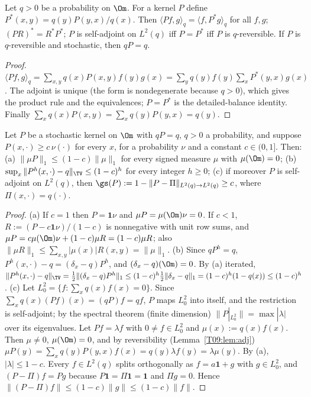 \documentclass[11pt]{report}
\begin{document}
\begin{T09lemma}[Adjoints]\label{T09:lem:adj}
Let $q>0$ be a probability on $\Om$. For a kernel $P$ define $P^*(x,y)=q(y)P(y,x)/q(x)$. Then $\langle Pf,g\rangle_{q}=\langle f,P^*g\rangle_q$ for all $f,g$; $(PR)^*=R^*P^*$; $P$ is self-adjoint on $L^2(q)$ iff $P=P^*$ iff $P$ is $q$-reversible. If $P$ is $q$-reversible and stochastic, then $qP=q$.
\end{T09lemma}
\begin{proof}
$\langle Pf,g\rangle_q=\sum_{x,y}q(x)P(x,y)f(y)g(x)=\sum_{y}q(y)f(y)\sum_x P^*(y,x)g(x)$. The adjoint is unique (the form is nondegenerate because $q>0$), which gives the product rule and the equivalences; $P=P^*$ is the detailed-balance identity. Finally $\sum_xq(x)P(x,y)=\sum_x q(y)P(y,x)=q(y)$.
\end{proof}

\begin{T09lemma}\label{T09:lem:doeb}
Let $P$ be a stochastic kernel on $\Om$ with $qP=q$, $q>0$ a probability, and suppose $P(x,\cdot)\ge c\,\nu(\cdot)$ for every $x$, for a probability $\nu$ and a constant $c\in(0,1]$. Then:
(a) $\|\mu P\|_1\le(1-c)\|\mu\|_1$ for every signed measure $\mu$ with $\mu(\Om)=0$;
(b) $\sup_x\|P^h(x,\cdot)-q\|_{\TV}\le(1-c)^h$ for every integer $h\ge0$;
(c) if moreover $P$ is self-adjoint on $L^2(q)$, then $\gs(P):=1-\|P-\Pi\|_{L^2(q)\to L^2(q)}\ge c$, where $\Pi(x,\cdot)=q(\cdot)$.
\end{T09lemma}
\begin{proof}
(a) If $c=1$ then $P=\mathbf 1\nu$ and $\mu P=\mu(\Om)\nu=0$. If $c<1$, $R:=(P-c\mathbf 1\nu)/(1-c)$ is nonnegative with unit row sums, and $\mu P=c\mu(\Om)\nu+(1-c)\mu R=(1-c)\mu R$; also $\|\mu R\|_1\le\sum_{x,y}|\mu(x)|R(x,y)=\|\mu\|_1$.
(b) Since $qP^h=q$, $P^h(x,\cdot)-q=(\delta_x-q)P^h$, and $(\delta_x-q)(\Om)=0$. By (a) iterated, $\|P^h(x,\cdot)-q\|_\TV=\tfrac12\|(\delta_x-q)P^h\|_1\le(1-c)^h\tfrac12\|\delta_x-q\|_1=(1-c)^h(1-q(x))\le(1-c)^h$.
(c) Let $L^2_0=\{f:\sum_xq(x)f(x)=0\}$. Since $\sum_x q(x)(Pf)(x)=(qP)f=qf$, $P$ maps $L^2_0$ into itself, and the restriction is self-adjoint; by the spectral theorem (finite dimension) $\|P|_{L^2_0}\|=\max|\lambda|$ over its eigenvalues. Let $Pf=\lambda f$ with $0\ne f\in L^2_0$ and $\mu(x):=q(x)f(x)$. Then $\mu\ne0$, $\mu(\Om)=0$, and by reversibility (Lemma~\ref{T09:lem:adj}) $\mu P(y)=\sum_x q(y)P(y,x)f(x)=q(y)\lambda f(y)=\lambda\mu(y)$. By (a), $|\lambda|\le1-c$. Every $f\in L^2(q)$ splits orthogonally as $f=a\mathbf 1+g$ with $g\in L^2_0$, and $(P-\Pi)f=Pg$ because $P\mathbf 1=\Pi\mathbf 1=\mathbf 1$ and $\Pi g=0$. Hence $\|(P-\Pi)f\|\le(1-c)\|g\|\le(1-c)\|f\|$.
\end{proof}
\end{document}
